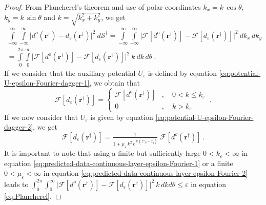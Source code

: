 \documentclass[manuscript,noblind]{geophysics}
\begin{document}
\begin{proof}
		From Plancherel's theorem \citep[][ p. 119]{bracewell1999} and use of polar coordinates 
		$k_{x} = k \, \cos\theta$, $k_{y} = k \, \sin\theta$ and $k = \sqrt{k_{x}^{2} + k_{y}^{2}}$,
		we get
		\begin{equation}
			\begin{split}
				\int\limits_{-\infty}^{\infty} \int\limits_{-\infty}^{\infty}
				\vert 
				d^{o}(\mathbf{r}^{\dagger}) - d_{\varepsilon}(\mathbf{r}^{\dagger})
				\vert^{2} 
				\: d\mathcal{S}^{\dagger} = 
				\int\limits_{-\infty}^{\infty} \int\limits_{-\infty}^{\infty}
				\vert \mathcal{F} [ d^{o}(\mathbf{r}^{\dagger}) ] - \mathcal{F} [
				d_{\varepsilon}(\mathbf{r}^{\dagger}) ] \vert^{2} 
				\: d k_{x} \, d k_{y} \\
				= \int\limits_{0}^{2\pi} \int\limits_{0}^{\infty}
				\vert \mathcal{F} [ d^{o}(\mathbf{r}^{\dagger}) ] - \mathcal{F} [
				d_{\varepsilon}(\mathbf{r}^{\dagger}) ] \vert^{2} \: k \: d k \, d \theta \: .
			\end{split}
			\label{eq:Plancherel}
		\end{equation}
		If we consider that the auxiliary potential $U_{\varepsilon}$ is defined by equation \ref{eq:potential-U-epsilon-Fourier-dagger-1},
		we obtain that 
		\begin{equation}
			\mathcal{F} [ d_{\varepsilon}(\mathbf{r}^{\dagger}) ] = 
			\begin{cases}
				\mathcal{F} [ d^{o}(\mathbf{r}^{\dagger}) ] &
				, \quad 0 < k \le k_{\varepsilon} \\
				0 & , \quad k > k_{\varepsilon} 
			\end{cases} \: .
			\label{eq:predicted-data-continuous-layer-epsilon-Fourier-1}
		\end{equation}
		If we now consider that $U_{\varepsilon}$ is given by equation \ref{eq:potential-U-epsilon-Fourier-dagger-2},
		we get
		\begin{equation}
			\mathcal{F} [ d_{\varepsilon}(\mathbf{r}^{\dagger}) ] = 
			\tfrac{1}{1 + \mu_{\varepsilon} \, k^{2} \, e^{\, k \, (z''_{0} - z^{\dagger}_{0})}} \; 
			\mathcal{F} [ d^{o}(\mathbf{r}^{\dagger}) ] \: .
			\label{eq:predicted-data-continuous-layer-epsilon-Fourier-2}
		\end{equation}
		It is important to note that using a finite but sufficiently large $0 < k_{\varepsilon} < \infty$ in equation 
		\ref{eq:predicted-data-continuous-layer-epsilon-Fourier-1} or a finite $0 < \mu_{\varepsilon} < \infty$ in 
		equation \ref{eq:predicted-data-continuous-layer-epsilon-Fourier-2} leads to  
		$\int_{0}^{2\pi} \int_{0}^{\infty} \vert \mathcal{F} [ d^{o}(\mathbf{r}^{\dagger}) ] - \mathcal{F} [d_{\varepsilon}(\mathbf{r}^{\dagger}) ] \vert^{2} \: k \, dkd\theta \le \varepsilon$ in equation \ref{eq:Plancherel}. 

\end{proof}
\end{document}
